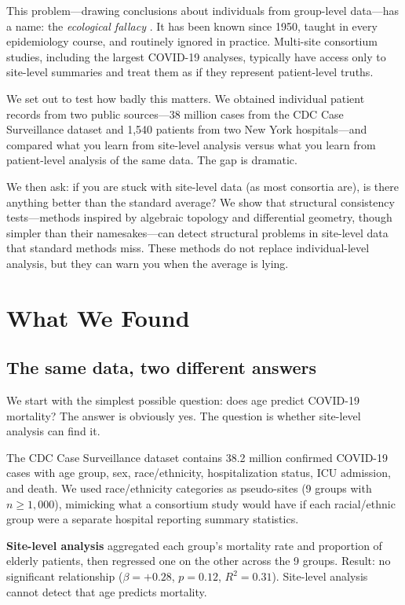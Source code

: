 \documentclass{article}
\begin{document}
This problem---drawing conclusions about individuals from group-level
data---has a name: the \emph{ecological fallacy}
\cite{robinson1950ecological}.  It has been known since 1950, taught in every
epidemiology course, and routinely ignored in practice.  Multi-site consortium
studies, including the largest COVID-19 analyses, typically have access only to
site-level summaries and treat them as if they represent patient-level truths.

We set out to test how badly this matters.  We obtained individual patient
records from two public sources---38 million cases from the CDC Case
Surveillance dataset and 1,540 patients from two New York hospitals---and
compared what you learn from site-level analysis versus what you learn from
patient-level analysis of the same data.  The gap is dramatic.

We then ask: if you are stuck with site-level data (as most consortia are), is
there anything better than the standard average?  We show that structural
consistency tests---methods inspired by algebraic topology and differential
geometry, though simpler than their namesakes---can detect structural problems
in site-level data that standard methods miss.  These methods do not replace
individual-level analysis, but they can warn you when the average is lying.


\section{What We Found}

\subsection{The same data, two different answers}

We start with the simplest possible question: does age predict COVID-19
mortality?  The answer is obviously yes.  The question is whether site-level
analysis can find it.

The CDC Case Surveillance dataset contains 38.2 million confirmed COVID-19
cases with age group, sex, race/ethnicity, hospitalization status, ICU
admission, and death.  We used race/ethnicity categories as pseudo-sites (9
groups with $n \geq 1{,}000$), mimicking what a consortium study would have
if each racial/ethnic group were a separate hospital reporting summary
statistics.

\textbf{Site-level analysis} aggregated each group's mortality rate and
proportion of elderly patients, then regressed one on the other across the 9
groups.  Result: no significant relationship ($\beta = +0.28$, $p = 0.12$,
$R^2 = 0.31$).  Site-level analysis cannot detect that age predicts mortality.
\end{document}
